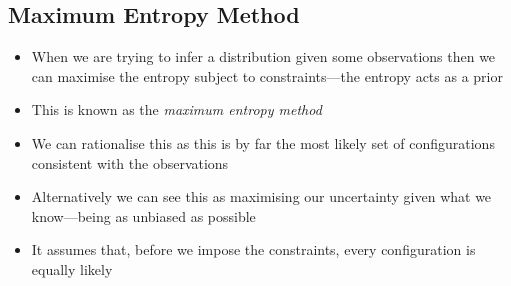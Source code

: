
\begin{slide}
\section{Maximum Entropy Method}

\begin{PauseHighLight}
  \begin{itemize}
  \item When we are trying to infer a distribution given some
    observations then we can maximise the entropy subject to
    constraints\pause---the entropy acts as a prior\pauseb
  \item This is known as the \emph{maximum entropy method}\pause
  \item We can rationalise this as this is by far the most likely set
    of configurations consistent with the observations\pause
  \item Alternatively we can see this as maximising our uncertainty
    given what we know\pause---being as unbiased as possible\pauseb
  \item It assumes that, before we impose the constraints, every
    configuration is equally likely\pause
  \end{itemize}
\end{PauseHighLight}

\end{slide}


